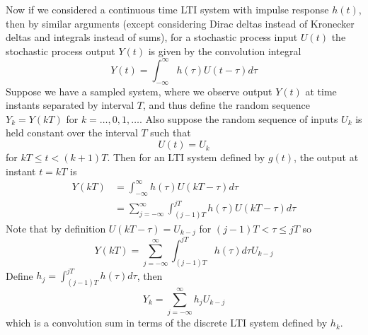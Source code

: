 \documentclass[11pt]{report} %
\begin{document}
Now if we considered a continuous time LTI system with impulse response $h\left(t\right)$, then by similar arguments (except considering Dirac deltas instead of Kronecker deltas and integrals instead of sums), for a stochastic process input $U\left(t\right)$ the stochastic process output $Y\left(t\right)$ is given by the convolution integral
\begin{equation}
Y\left(t\right) = \int_{-\infty}^{\infty}h\left(\tau\right)U\left(t - \tau\right)d\tau
\end{equation}
Suppose we have a sampled system, where we observe output $Y\left(t\right)$ at time instants separated by interval $T$, and thus define the random sequence $Y_{k} = Y\left(kT\right)$ for $k = \dots, 0, 1, \dots$. Also suppose the random sequence of inputs $U_{k}$ is held constant over the interval $T$ such that
\begin{equation}
U\left(t\right) = U_{k}
\end{equation}
for $kT \leq t < \left(k + 1\right)T$. Then for an LTI system defined by $g\left(t\right)$, the output at instant $t = kT$ is
\begin{align}
Y\left(kT\right) &= \int_{-\infty}^{\infty}h\left(\tau\right)U\left(kT - \tau\right)d\tau \\
&= \sum_{j = -\infty}^{\infty}\int_{\left(j - 1\right)T}^{jT}h\left(\tau\right)U\left(kT - \tau\right)d\tau
\end{align}
Note that by definition $U\left(kT - \tau\right) = U_{k - j}$ for $\left(j - 1\right)T < \tau \leq jT$ so
\begin{equation}
Y\left(kT\right) = \sum_{j = -\infty}^{\infty}\int_{\left(j - 1\right)T}^{jT}h\left(\tau\right)d\tau U_{k - j}
\end{equation}
Define $h_{j} = \int_{\left(j - 1\right)T}^{jT}h\left(\tau\right)d\tau$, then
\begin{equation}
Y_{k} = \sum_{j = -\infty}^{\infty}h_{j}U_{k - j}
\end{equation}
which is a convolution sum in terms of the discrete LTI system defined by $h_{k}$. \\
\end{document}
